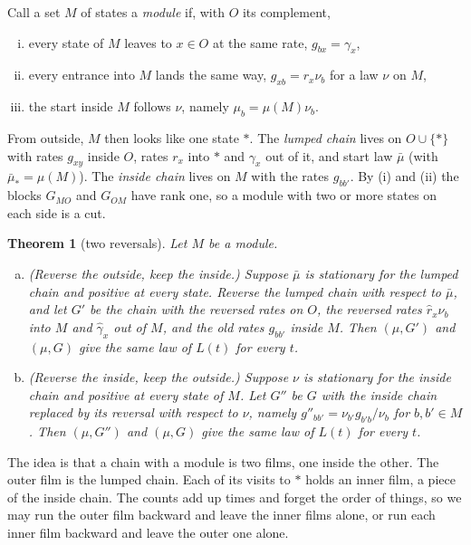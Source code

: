 \documentclass[11pt]{article}
\newtheorem{theorem}{Theorem}[section]
\theoremstyle{definition}
\theoremstyle{remark}
\begin{document}
Call a set $M$ of states a \emph{module} if, with $O$ its complement,
\begin{enumerate}[(i),itemsep=1pt]
\item every state of $M$ leaves to $x\in O$ at the same rate, $g_{bx}=\gamma_x$,
\item every entrance into $M$ lands the same way, $g_{xb}=r_x\nu_b$ for a law
 $\nu$ on $M$,
\item the start inside $M$ follows $\nu$, namely $\mu_b=\mu(M)\nu_b$.
\end{enumerate}
From outside, $M$ then looks like one state $\ast$. The \emph{lumped chain} lives
on $O\cup\{\ast\}$ with rates $g_{xy}$ inside $O$, rates $r_x$ into $\ast$ and
$\gamma_x$ out of it, and start law $\bar\mu$ (with $\bar\mu_\ast=\mu(M)$). The
\emph{inside chain} lives on $M$ with the rates $g_{bb'}$. By (i) and (ii) the
blocks $G_{MO}$ and $G_{OM}$ have rank one, so a module with two or more states
on each side is a cut.

\begin{theorem}[two reversals]\label{thm:lumping}
Let $M$ be a module.
\begin{enumerate}[(a),itemsep=1pt]
\item (Reverse the outside, keep the inside.) Suppose $\bar\mu$ is stationary
 for the lumped chain and positive at every state. Reverse the lumped chain with respect to $\bar\mu$, and
 let $G'$ be the chain with the reversed rates on $O$, the reversed rates
 $\hat r_x\nu_b$ into $M$ and $\hat\gamma_x$ out of $M$, and the old rates
 $g_{bb'}$ inside $M$. Then $(\mu,G')$ and $(\mu,G)$ give the same law of $L(t)$
 for every $t$.
\item (Reverse the inside, keep the outside.) Suppose $\nu$ is stationary for
 the inside chain and positive at every state of $M$. Let $G''$ be $G$ with the
 inside chain replaced by its reversal with respect to $\nu$, namely
 $g''_{bb'}=\nu_{b'}g_{b'b}/\nu_b$ for $b,b'\in M$. Then $(\mu,G'')$ and
 $(\mu,G)$ give the same law of $L(t)$ for every $t$.
\end{enumerate}
\end{theorem}

The idea is that a chain with a module is two films, one inside the other. The
outer film is the lumped chain. Each of its visits to $\ast$ holds an inner
film, a piece of the inside chain. The counts add up times and forget the order
of things, so we may run the outer film backward and leave the inner films
alone, or run each inner film backward and leave the outer one alone.
\end{document}
